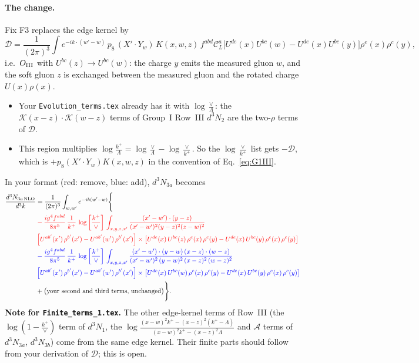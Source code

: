 \documentclass[10pt]{article}
\numberwithin{equation}{section}
\newcommand{\nc}{\color{blue}}
\newcommand{\rc}{\color{red}}
\newcommand{\KK}{\mathcal K}
\newcommand{\CL}{\mathcal C_L}
\newcommand{\pre}{\frac{1}{(2\pi)^3}}
\newcommand{\phw}{e^{-ik\cdot(w'-w)}}
\begin{document}
\paragraph{The change.} Fix F3 replaces the edge kernel by
\begin{equation}
\mathcal D=\pre\int\phw\,p_8\,(X'\!\cdot Y_w)\,K(x,w,z)\,f^{abd}\CL^a\big[U^{de}(x)U^{bc}(w)-U^{de}(x)U^{bc}(y)\big]\rho^e(x)\rho^c(y),
\end{equation}
i.e.\ $O_{\rm III}$ with $U^{bc}(z)\to U^{bc}(w)$: the charge $y$ emits the measured gluon $w$, and the soft gluon $z$ is exchanged between the measured gluon and the rotated charge $U(x)\rho(x)$.
\begin{itemize}
\item Your \texttt{Evolution\_terms.tex} already has it with $\log\frac{\vee}{\Lambda}$: the $\KK(x-z)\cdot\KK(w-z)$ terms of Group~I Row~III $d^3N_2$ are the two-$\rho$ terms of $\mathcal D$.
\item This region multiplies $\log\frac{k^+}{\Lambda}=\log\frac{\vee}{\Lambda}-\log\frac{\vee}{k^+}$. So the $\log\frac{\vee}{k^+}$ list gets $-\mathcal D$, which is $+p_8(X'\!\cdot Y_w)K(x,w,z)$ in the convention of Eq.~\eqref{eq:G1III}.
\end{itemize}
In your format (red: remove, blue: add), $d^3N_{3a}$ becomes
\begin{align}
\frac{d^{3}N_{3a\,\rm NLO}}{d^{3}k} & =\frac{1}{(2\pi)^{3}}\int_{w,w'}e^{-ik(w'-w)}\Bigg\{\notag \\
& \rc -\frac{ig^{4}f^{abd}}{8\pi^{5}}\,\frac{1}{k^{+}}\, \log{\left[\frac{k^{+}}{\vee}\right]}\,\int_{x,y,z,x'}\frac{(x'-w')\cdot(y-z)}{(x'-w')^{2}(y-z)^{2}(z-w)^{2}}\notag \\
& \rc \left[U^{ab'}(x')\,\rho^{b'}(x')-U^{ab'}(w')\, \rho^{b'}(x')\right]\times \left[U^{de}(x)\,U^{bc}(z)\, \rho^{e}(x)\,\rho^{c}(y)-U^{de}(x)\,U^{bc}(y)\,\rho^{e}(x)\,\rho^{c}(y)\right]\notag \\
& \nc -\frac{ig^{4}f^{abd}}{8\pi^{5}}\,\frac{1}{k^{+}}\, \log{\left[\frac{k^{+}}{\vee}\right]}\,\int_{x,y,z,x'}\frac{(x'-w')\cdot(y-w)\,(x-z)\cdot(w-z)}{(x'-w')^{2}\,(y-w)^{2}\,(x-z)^{2}\,(w-z)^{2}}\notag \\
& \nc \left[U^{ab'}(x')\,\rho^{b'}(x')-U^{ab'}(w')\, \rho^{b'}(x')\right]\times \left[U^{de}(x)\,U^{bc}(w)\, \rho^{e}(x)\,\rho^{c}(y)-U^{de}(x)\,U^{bc}(y)\,\rho^{e}(x)\,\rho^{c}(y)\right]\notag \\
& +\big(\text{your second and third terms, unchanged}\big)\Bigg\}.
\end{align}
\textbf{Note for \texttt{Finite\_terms\_1.tex}.} The other edge-kernel terms of Row~III (the $\log(1-\frac{k^+}{\vee})$ term of $d^3N_1$, the $\log\frac{(x-w)^2k^+-(x-z)^2(k^+-\Lambda)}{(x-w)^2k^+-(x-z)^2\Lambda}$ and $\mathcal A$ terms of $d^3N_{3a}$, $d^3N_{3b}$) come from the same edge kernel. Their finite parts should follow from your derivation of $\mathcal D$; this is open.
\end{document}
